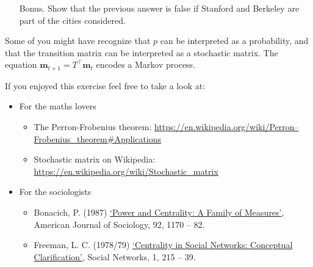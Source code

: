 \begin{enumerate}
\item[Bonus.] Show that the previous answer is false if Stanford and Berkeley are part of the cities considered.

\sol{}
\end{enumerate}


Some of you might have recognize that $p$ can be interpreted as a probability, and that the transition matrix can be interpreted as a stochastic matrix. 
The equation $\mathbf{m}_{t+1} = T^\top \mathbf{m}_{t}$ encodes a Markov process.

If you enjoyed this exercise feel free to take a look at:
\begin{itemize}
    \item For the maths lovers
    \begin{itemize}
        \item The Perron-Frobenius theorem: \url{https://en.wikipedia.org/wiki/Perron–Frobenius_theorem#Applications}
        \item Stochastic matrix on Wikipedia: \url{https://en.wikipedia.org/wiki/Stochastic_matrix}
    \end{itemize}
    \item For the sociologists
    \begin{itemize}
        \item Bonacich, P. (1987) \href{http://www.leonidzhukov.net/hse/2014/socialnetworks/papers/Bonacich-Centrality.pdf}{‘Power and Centrality: A Family of Measures’}, American Journal of Sociology, 92, 1170 – 82.
        \item Freeman, L. C. (1978/79) \href{http://www.leonidzhukov.net/hse/2018/sna/papers/freeman79-centrality.pdf}{‘Centrality in Social Networks: Conceptual Clarification’}, Social Networks, 1, 215 – 39.
    \end{itemize}
\end{itemize}
